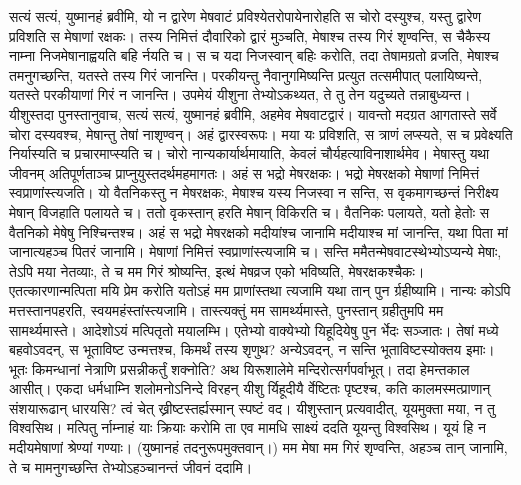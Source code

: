 \adhyAya
{}
\vakya सत्यं सत्यं, युष्मानहं ब्रवीमि, यो न द्वारेण मेषवाटं प्रविश्येतरोपायेनारोहति स चोरो दस्युश्च,
\vakya यस्तु द्वारेण प्रविशति स मेषाणां रक्षकः।
\vakya तस्य निमित्तं दौवारिको द्वारं मुञ्चति, मेषाश्च तस्य गिरं शृण्वन्ति, स चैकैस्य नाम्ना निजमेषानाह्वयति बहि र्नयति च।
\vakya स च यदा निजस्वान् बहिः करोति, तदा तेषामग्रतो व्रजति, मेषाश्च तमनुगच्छन्ति, यतस्ते तस्य गिरं जानन्ति।
\vakya परकीयन्तु नैवानुगमिष्यन्ति प्रत्युत तत्समीपात् पलायिष्यन्ते, यतस्ते परकीयाणां गिरं न जानन्ति।
\vakya उपमेयं यीशुना तेभ्योऽकथ्यत, ते तु तेन यदुच्यते तन्नाबुध्यन्त।
\vakya यीशुस्तदा पुनस्तानुवाच, सत्यं सत्यं, युष्मानहं ब्रवीमि, अहमेव मेषवाटद्वारं।
\vakya यावन्तो मदग्रत आगतास्ते सर्वे चोरा दस्यवश्च, मेषान्तु तेषां नाशृण्वन्।
\vakya अहं द्वारस्वरूपः। मया यः प्रविशति, स त्राणं लप्स्यते, स च प्रवेक्ष्यति निर्यास्यति च प्रचारमाप्स्यति च।
\vakya चोरो नान्यकार्यार्थमायाति, केवलं चौर्यहत्याविनाशार्थमेव। मेषास्तु यथा जीवनम् अतिपूर्णताञ्च प्राप्नुयुस्तदर्थमहमागतः।
\vakya अहं स भद्रो मेषरक्षकः। भद्रो मेषरक्षको मेषाणां निमित्तं स्वप्राणांस्त्यजति।
\vakya यो वैतनिकस्तु न मेषरक्षकः, मेषाश्च यस्य निजस्वा न सन्ति, स वृकमागच्छन्तं निरीक्ष्य मेषान् विजहाति पलायते च। ततो वृकस्तान् हरति मेषान् विकिरति च।
\vakya वैतनिकः पलायते, यतो हेतोः स वैतनिको मेषेषु निश्चिन्तश्च।
\vakya अहं स भद्रो मेषरक्षको मदीयांश्च जानामि मदीयाश्च मां जानन्ति,
\vakya यथा पिता मां जानात्यहञ्च पितरं जानामि। मेषाणां निमित्तं स्वप्राणांस्त्यजामि च।
\vakya सन्ति ममैतन्मेषवाटस्थेभ्योऽप्यन्ये मेषाः, तेऽपि मया नेतव्याः, ते च मम गिरं श्रोष्यन्ति, इत्थं मेषव्रज एको भविष्यति, मेषरक्षकश्चैकः।
\vakya एतत्कारणान्मत्पिता मयि प्रेम करोति यतोऽहं मम प्राणांस्तथा त्यजामि यथा तान् पुन र्ग्रहीष्यामि।
\vakya नान्यः कोऽपि मत्तस्तानपहरति, स्वयमहंस्तांस्त्यजामि। तास्त्यक्तुं मम सामर्थ्यमास्ते, पुनस्तान् ग्रहीतुमपि मम सामर्थ्यमास्ते। आदेशोऽयं मत्पितृतो मयालम्भि।
\vakya एतेभ्यो वाक्येभ्यो यिहूदियेषु पुन र्भेदः सञ्जातः।
\vakya तेषां मध्ये बहवोऽवदन्, स भूताविष्ट उन्मत्तश्च, किमर्थं तस्य शृणुथ?
\vakya अन्येऽवदन्, न सन्ति भूताविष्टस्योक्तय इमाः। भूतः किमन्धानां नेत्राणि प्रसन्नीकर्तुं शक्नोति?
\vakya अथ यिरूशालेमे मन्दिरोत्सर्गपर्वाभूत्। तदा हेमन्तकाल आसीत्।
\vakya एकदा धर्मधाम्नि शलोमनोऽनिन्दे विरहन् यीशु र्यिहूदीयै र्वेष्टितः पृष्टश्च,
\vakya कति कालमस्मत्प्राणान् संशयारूढान् धारयसि? त्वं चेत् ख्रीष्टस्तर्ह्यस्मान् स्पष्टं वद।
\vakya यीशुस्तान् प्रत्यवादीत्, यूयमुक्ता मया, न तु विश्वसिथ। मत्पितु र्नाम्नाहं याः क्रियाः करोमि ता एव मामधि साक्ष्यं ददति यूयन्तु विश्वसिथ।
\vakya यूयं हि न मदीयमेषाणां श्रेण्यां गण्याः। (युष्मानहं तदनुरूपमुक्तवान्।)
\vakya मम मेषा मम गिरं शृण्वन्ति, अहञ्च तान् जानामि, ते च मामनुगच्छन्ति तेभ्योऽहञ्चानन्तं जीवनं ददामि।
